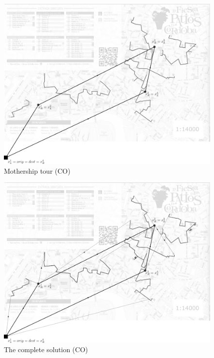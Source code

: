 \documentclass[10pt,a4paper]{elsarticle}
\begin{document}
\begin{figure}[h!]
	\centering
	\includegraphics[width=0.6\linewidth]{synchronous_1_gray.png}
	\caption{Mothership tour (CO) \label{fig:Mtour_CO}}
\end{figure}
\begin{figure}[h!]
	\centering
	\includegraphics[width=0.6\linewidth]{synchronous_2_gray.png}
	\caption{The complete solution (CO) \label{fig:tourD_CO}}
\end{figure}
\end{document}
